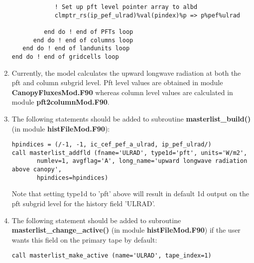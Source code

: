 \begin{enumerate}
\begin{verbatim}
            ! Set up pft level pointer array to albd
            clmptr_rs(ip_pef_ulrad)%val(pindex)%p => p%pef%ulrad

         end do ! end of PFTs loop
      end do ! end of columns loop
   end do ! end of landunits loop
end do ! end of gridcells loop
\end{verbatim}

\item
Currently, the model calculates the upward longwave radiation at
both the pft and column subgrid level. Pft level values are obtained
in module {\bf CanopyFluxesMod.F90} whereas column level values are
calculated in module {\bf pft2columnMod.F90}.

\item
The following statements should be added to subroutine {\bf
masterlist\_build()} (in module {\bf histFileMod.F90}):
\begin{verbatim}
hpindices = (/-1, -1, ic_cef_pef_a_ulrad, ip_pef_ulrad/)
call masterlist_addfld (fname='ULRAD', type1d='pft', units='W/m2',
       numlev=1, avgflag='A', long_name='upward longwave radiation above canopy', 
       hpindices=hpindices)
\end{verbatim}
Note that setting type1d to 'pft' above will result in default 1d
output on the pft subgrid level for the history field 'ULRAD'.
\item
The following statement should be added to subroutine {\bf
masterlist\_change\_active()} (in module {\bf histFileMod.F90}) if the
user wants this field on the primary tape by default:
\begin{verbatim}
call masterlist_make_active (name='ULRAD', tape_index=1)
\end{verbatim}

\end{enumerate}
